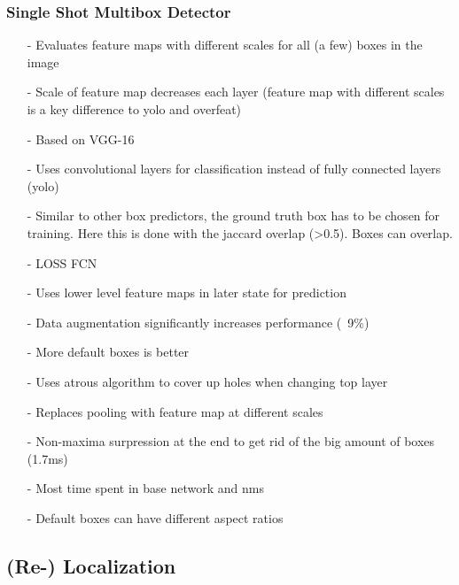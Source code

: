 \documentclass{article}
\begin{document}
\begin{multicols}{2}
			 \subsubsection{Single Shot Multibox Detector \cite{Liu}}
			 \begin{itemize}
			 	\item[-] Evaluates feature maps with different scales for all (a few) boxes in the image
			 	\item[-] Scale of feature map decreases each layer (feature map with different scales is a key difference to yolo and overfeat)
			 	\item[-] Based on VGG-16
			 	\item[-] Uses convolutional layers for classification instead of fully connected layers (yolo)
			 	\item[-] Similar to other box predictors, the ground truth box has to be chosen for training. Here this is done with the jaccard overlap (>0.5). Boxes can overlap.
			 	\item[-] LOSS FCN
			 	\item[-] Uses lower level feature maps in later state for prediction
			 	\item[-] Data augmentation significantly increases performance (~9\%)
			 	\item[-] More default boxes is better
			 	\item[-] Uses atrous algorithm to cover up holes when changing top layer
			 	\item[-] Replaces pooling with feature map at different scales
			 	\item[-] Non-maxima surpression at the end to get rid of the big amount of boxes (1.7ms)
			 	\item[-] Most time spent in base network and nms
			 	\item[-] Default boxes can have different aspect ratios
			 \end{itemize}
	\subsection{(Re-) Localization}

\end{multicols}
\end{document}
